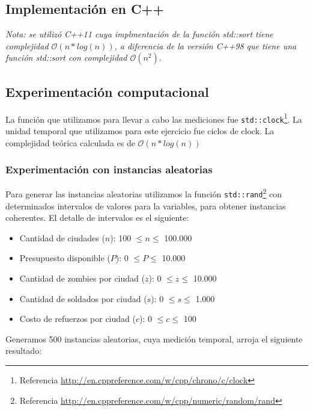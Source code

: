 
\newpage
\subsection{Implementación en C++}

\textit{Nota: se utilizó C++11 cuya implmentación de la función std::sort tiene complejidad $\mathcal{O}(n*log(n))$, a diferencia de la versión C++98 que tiene una función std::sort con complejidad $\mathcal{O}(n^2)$}.



\subsection{Experimentación computacional}
La función que utilizamos para llevar a cabo las mediciones fue \texttt{std::clock}\footnote{Referencia \url{http://en.cppreference.com/w/cpp/chrono/c/clock}}. La unidad temporal que utilizamos para este ejercicio fue ciclos de clock.
La complejidad teórica calculada es de $\mathcal{O}(n*log(n))$

\subsubsection{Experimentación con instancias aleatorias}
Para generar las instancias aleatorias utilizamos la función \texttt{std::rand}\footnote{Referencia \url{http://en.cppreference.com/w/cpp/numeric/random/rand}} con determinados intervalos de valores para la variables, para obtener instancias coherentes. El detalle de intervalos es el siguiente:
\begin{itemize}
	\item Cantidad de ciudades ($n$): 100 $\leq n \leq$ 100.000
    \item Presupuesto disponible ($P$): 0 $\leq P \leq$ 10.000
    \item Cantidad de zombies por ciudad ($z$): 0 $\leq z \leq$ 10.000
    \item Cantidad de soldados por ciudad ($s$): 0 $\leq s \leq$ 1.000
    \item Costo de refuerzos por ciudad ($c$): 0 $\leq c \leq$ 100
\end{itemize}

Generamos 500 instancias aleatorias, cuya medición temporal, arroja el siguiente resultado:

